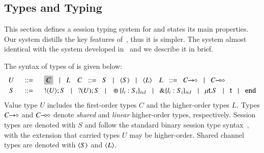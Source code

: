 \subsection{Types and Typing}
\label{sec:types}

\noi %
This section defines a session typing system for \HOp and states its main properties.
Our system distills the key features of~\cite{tlca07,MostrousY15},
thus it is simpler.
The system almost identical with the system developed in~\cite{characteristic_bis}
and we describe it in brief.


The syntax of types of \HOp is given below: 
\[
	\begin{array}{rcl}
		U & \bnfis &	\nonhosyntax{C} \bnfbar L
		\quad
		C  \bnfis		S \bnfbar \chtype{S} \bnfbar \chtype{L}
		\quad
		L \bnfis		\shot{C} \bnfbar \lhot{C}
		\\[1mm]

		S & \bnfis &	\btout{U} S \bnfbar \btinp{U} S \bnfbar \btsel{l_i:S_i}_{i \in I}
						\bnfbar \btbra{l_i:S_i}_{i \in I} \bnfbar  \trec{t}{S} \bnfbar \vart{t}  \bnfbar \tinact
	\end{array}
\]
Value type $U$ includes
the first-order types $C$ and the higher-order
types $L$.
Types $C\!\! \rightarrow\!\! \diamond$ and $C\!\! \multimap\!\! \diamond$ denote
{\em shared} and {\em linear} higher-order 
types, respectively.
Session types are denoted with $S$ and
follow the standard binary session type syntax~\cite{}, with
the extension that carried types $U$ may be higher-order.
Shared channel types are denoted with $\langle S \rangle$ and $\langle L \rangle$.
 
